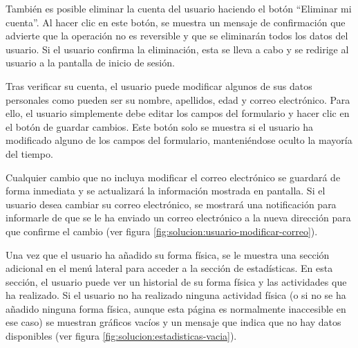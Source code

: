 

También es posible eliminar la cuenta del usuario haciendo el botón \enquote{Eliminar mi cuenta}.
Al hacer clic en este botón, se muestra un mensaje de confirmación que advierte que la operación
no es reversible y que se eliminarán todos los datos del usuario. Si el usuario confirma la
eliminación, esta se lleva a cabo y se redirige al usuario a la pantalla de inicio de sesión.

Tras verificar su cuenta, el usuario puede modificar algunos de sus datos personales como pueden
ser su nombre, apellidos, edad y correo electrónico. Para ello, el usuario simplemente debe editar
los campos del formulario y hacer clic en el botón de guardar cambios. Este botón solo se muestra
si el usuario ha modificado alguno de los campos del formulario, manteniéndose oculto la mayoría
del tiempo.

Cualquier cambio que no incluya modificar el correo electrónico se guardará de forma inmediata y se
actualizará la información mostrada en pantalla. Si el usuario desea cambiar su correo electrónico,
se mostrará una notificación para informarle de que se le ha enviado un correo electrónico a la
nueva dirección para que confirme el cambio (ver figura \ref{fig:solucion:usuario-modificar-correo}).


Una vez que el usuario ha añadido su forma física, se le muestra una sección adicional en el menú
lateral para acceder a la sección de estadísticas. En esta sección, el usuario puede ver un historial
de su forma física y las actividades que ha realizado. Si el usuario no ha realizado ninguna actividad
física (o si no se ha añadido ninguna forma física, aunque esta página es normalmente inaccesible en
ese caso) se muestran gráficos vacíos y un mensaje que indica que no hay datos disponibles (ver figura
\ref{fig:solucion:estadisticas-vacia}).

